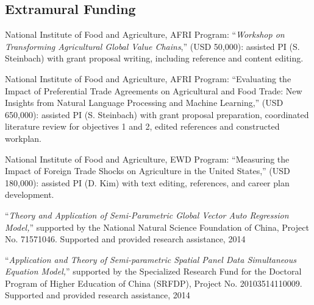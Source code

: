 \documentclass[10.5 pt,letterpaper]{article}
\renewenvironment{itemize}{
	\begin{list}{}{
			\setlength{\leftmargin}{1.5em}
		}
	}{
	\end{list}
}
\begin{document}
 
 
 
		
 \subsection*{\textbf{Extramural Funding}}
		
\begin{itemize}

\item[-]  National Institute of Food and Agriculture, AFRI Program: ``\textit{Workshop on Transforming Agricultural Global Value Chains},'' (USD 50,000): assisted PI (S. Steinbach) with grant proposal writing, including reference and content editing. 
			
\item [-] National Institute of Food and Agriculture, AFRI Program: “Evaluating the Impact of Preferential Trade Agreements on Agricultural and Food Trade: New Insights from Natural Language Processing and Machine Learning,”  (USD 650,000): assisted PI (S. Steinbach) with grant proposal preparation, coordinated literature review for objectives 1 and 2, edited references and constructed workplan. 
			
\item [-] National Institute of Food and Agriculture, EWD Program: “Measuring the Impact of Foreign Trade Shocks on Agriculture in the United States,” (USD 180,000): assisted PI (D. Kim) with text editing, references, and career plan development. 
			
			
			
 
			
	\item[-] ``\textit{Theory and Application of Semi-Parametric Global Vector Auto Regression Model,}'' supported by the National Natural Science Foundation of China, Project No. 71571046. Supported and provided research assistance, 2014
				
	\item [-] ``\textit{Application and Theory of Semi-parametric Spatial Panel Data Simultaneous Equation Model,}'' supported by the Specialized Research Fund for the Doctoral Program of Higher Education of China (SRFDP), Project No. 20103514110009. Supported and provided research assistance, 2014
				
				
				
\end{itemize}
		
		
 
	
	
\end{document}
